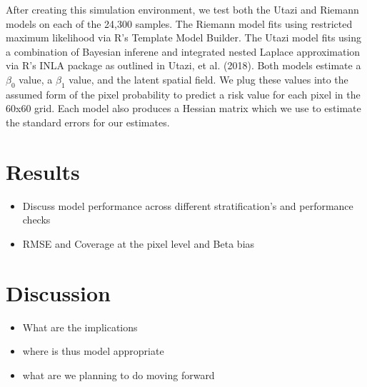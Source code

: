 \documentclass{article}
\begin{document}
After creating this simulation environment, we test both the Utazi and Riemann models on each of the 24,300 samples. The Riemann model fits using restricted maximum likelihood via R's Template Model Builder. The Utazi model fits using a combination of Bayesian inferene and integrated nested Laplace approximation via R's INLA package as outlined in Utazi, et al. (2018). Both models estimate a $\beta_0$ value, a  $\beta_1$ value, and the latent spatial field. We plug these values into the assumed form of the pixel probability to predict a risk value for each pixel in the 60x60 grid. Each model also produces a Hessian matrix which we use to estimate the standard errors for our estimates.














\section{Results}\label{results}

\begin{itemize}
\item  Discuss model performance across different stratification's and performance checks
\item RMSE and Coverage at the pixel level and Beta bias
\end{itemize}

\section{Discussion}\label{discussion}

\begin{itemize}
\item What are the implications
\item where is thus model appropriate
\item what are we planning to do moving forward
\end{itemize}

\newpage



\end{document}
